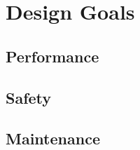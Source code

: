 \section{Design Goals} \label{sec:goal}
\subsection{Performance}
\subsection{Safety}
\subsection{Maintenance}
